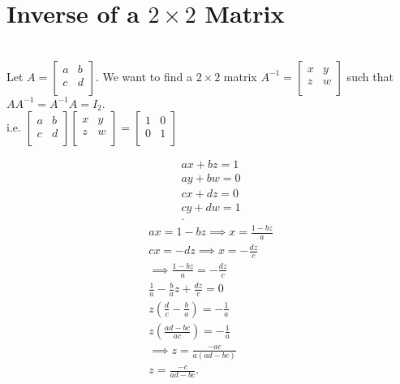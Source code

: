 \documentclass[../main.tex]{subfiles}
\begin{document}
\section{Inverse of a $2\times 2$ Matrix}\\
Let $A = \begin{bmatrix}
a & b\\
c & d\\
\end{bmatrix}$. We want to find a $2\times 2$ matrix $A^{-1}= \begin{bmatrix}
x & y\\
z & w\\
\end{bmatrix}$ such that $A A^{-1}= A^{-1}A= I_2$.\\
i.e. $\begin{bmatrix}
a & b\\
c & d\\
\end{bmatrix}\begin{bmatrix}
x & y\\
z & w\\
\end{bmatrix}= \begin{bmatrix}
1 & 0\\
0 & 1\\
\end{bmatrix}$
\raggedcolumns
\begin{multicols}{2}
\begin{align*}
        ax+bz=1\\
        ay+bw=0\\
        cx+dz=0\\
        cy+dw=1\\
.\end{align*}
\break
\begin{align*}
        ax=1-bz \implies x= \frac{1-bz}{a}\\
        cx=-dz \implies x= - \frac{dz}{c}\\
        \implies \frac{1-bz}{a}= - \frac{dz}{c}\\
        \frac{1}{a} - \frac{b}{a}z + \frac{dz}{c}=0\\
        z \left( \frac{d}{c}-\frac{b}{a} \right) = - \frac{1}{a}\\
        z \left( \frac{ad-bc}{ac} \right) =-\frac{1}{a}\\
        \implies z= \frac{-ac}{a \left( ad-bc \right) }\\
        z= \frac{-c}{ad-bc}
.\end{align*}
\end{multicols}\\
\end{document}
